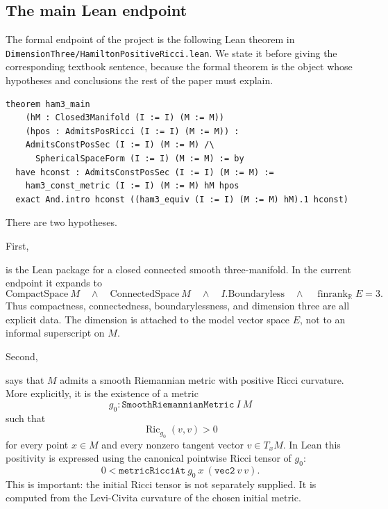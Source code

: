 \documentclass[11pt]{article}
\theoremstyle{plain}
\theoremstyle{definition}
\theoremstyle{remark}
\begin{document}
\subsection{The main Lean endpoint}
\label{subsec:main-lean-endpoint}

The formal endpoint of the project is the following Lean theorem in
\texttt{DimensionThree/HamiltonPositiveRicci.lean}.  We state it before giving
the corresponding textbook sentence, because the formal theorem is the object
whose hypotheses and conclusions the rest of the paper must explain.

\begin{verbatim}
theorem ham3_main
    (hM : Closed3Manifold (I := I) (M := M))
    (hpos : AdmitsPosRicci (I := I) (M := M)) :
    AdmitsConstPosSec (I := I) (M := M) /\
      SphericalSpaceForm (I := I) (M := M) := by
  have hconst : AdmitsConstPosSec (I := I) (M := M) :=
    ham3_const_metric (I := I) (M := M) hM hpos
  exact And.intro hconst ((ham3_equiv (I := I) (M := M) hM).1 hconst)
\end{verbatim}



There are two hypotheses.

First,
\begin{center}
\texttt{}
\end{center}
is the Lean package for a closed connected smooth three-manifold.  In the
current endpoint it expands to
\[
  \mathrm{CompactSpace}\ M
  \quad\wedge\quad
  \mathrm{ConnectedSpace}\ M
  \quad\wedge\quad
  I.\mathrm{Boundaryless}
  \quad\wedge\quad
  \operatorname{finrank}_{\mathbb{R}} E = 3.
\]
Thus compactness, connectedness, boundarylessness, and dimension three are all
explicit data.  The dimension is attached to the model vector space \(E\), not
to an informal superscript on \(M\).

Second,
\begin{center}
\texttt{}
\end{center}
says that \(M\) admits a smooth Riemannian metric with positive Ricci
curvature.  More explicitly, it is the existence of a metric
\[
  g_0 : \mathtt{SmoothRiemannianMetric}\ I\ M
\]
such that
\[
  \operatorname{Ric}_{g_0}(v,v)>0
\]
for every point \(x\in M\) and every nonzero tangent vector
\(v\in T_xM\).  In Lean this positivity is expressed using the canonical
pointwise Ricci tensor of \(g_0\):
\[
  0 <
  \mathtt{metricRicciAt}\ g_0\ x\ (\mathtt{vec2}\ v\ v).
\]
This is important: the initial Ricci tensor is not separately supplied.  It is
computed from the Levi-Civita curvature of the chosen initial metric.
\end{document}
